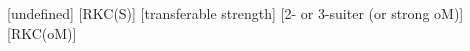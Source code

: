 \begin{bidsemi}
    [undefined]
    [RKC(S)]
[transferable strength]
    [2- or 3-suiter (or strong oM)]
[RKC(oM)]
\end{bidsemi}